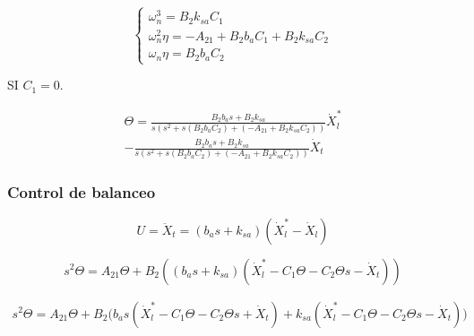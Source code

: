 \documentclass{article}
\begin{document}
            \begin{equation}
                \begin{cases}
                    \omega_n^3 = B_{2}k_{sa} C_1 \\
                    \omega_n^2 \eta = -A_{21} +B_{2}b_a C_1 +B_{2}k_{sa} C_2 \\
                    \omega_n \eta  = B_{2}b_a C_2 
                \end{cases}
            \end{equation}

            SI \(C_1=0\).

            \begin{equation}
                \begin{split}
                    \Theta= \frac{B_{2}b_a s + B_{2}k_{sa}}{s\left(s^2 + s \left(B_{2}b_a C_2\right) + \left(-A_{21} +B_{2}k_{sa} C_2 \right)\right)} \dot{X}_l^*\\
                    - \frac{B_{2}b_a s+B_{2}k_{sa}}{s\left(s^2 + s \left(B_{2}b_a C_2\right) + \left(-A_{21} +B_{2}k_{sa} C_2 \right)\right)} \dot{X}_t
                \end{split}
            \end{equation}

        \subsubsection{Control de balanceo}
            \begin{equation}
                U=\ddot{X}_t= \left(b_a s+k_{sa}\right) \left(\dot{X}_l^*- \dot{X}_l\right)
            \end{equation}
            
            \begin{equation}
                s^2 \Theta = A_{21} \Theta + B_{2} \left( \left(b_a s+k_{sa}\right) \left(\dot{X}_l^*- C_1 \Theta-C_2 \Theta s - \dot{X}_t\right) \right)
            \end{equation}

            \begin{equation}
                \begin{split}
                s^2 \Theta = A_{21} \Theta + B_{2} \biggl(  b_a s\left(\dot{X}_l^*- C_1 \Theta -C_2 \Theta s + \dot{X}_t\right) + k_{sa}\left(\dot{X}_l^* -C_1 \Theta -C_2 \Theta s - \dot{X}_t\right)\biggr)
                \end{split}
            \end{equation}
\end{document}

